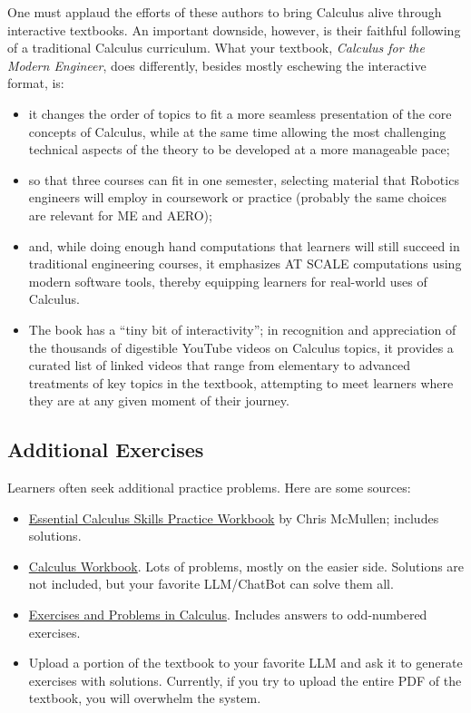 One must applaud the efforts of these authors to bring Calculus alive through interactive textbooks. An important downside, however, is their faithful following of a traditional Calculus curriculum. What your textbook, \textit{Calculus for the Modern Engineer}, does differently, besides mostly eschewing the interactive format, is:
\begin{itemize}
    \item it changes the order of topics to fit a more seamless presentation of the core concepts of Calculus, while at the same time allowing the most challenging technical aspects of the theory to be developed at a more manageable pace;
\item so that three courses can fit in one semester, selecting material that Robotics engineers will employ in coursework or practice (probably the same choices are relevant for ME and AERO);
\item and, while doing enough hand computations that learners will still succeed in traditional engineering courses, it emphasizes AT SCALE computations using modern software tools, thereby equipping learners for real-world uses of Calculus.
\item The book has a ``tiny bit of interactivity''; in recognition and appreciation of the thousands of digestible YouTube videos on Calculus topics, it provides a curated list of linked videos that range from elementary to advanced treatments of key topics in the textbook, attempting to meet learners where they are at any given moment of their journey. 
\end{itemize}

\subsection{Additional Exercises}

Learners often seek additional practice problems. Here are some sources:

\begin{itemize}

\item \href{https://www.youtube.com/shorts/TfhrNKDw4MY?feature=share}{Essential Calculus Skills Practice Workbook} by Chris McMullen; includes solutions. 

\item \href{https://www.rrcs.org/Downloads/Calc%20Workbook.pdf}{Calculus Workbook}. Lots of problems, mostly on the easier side. Solutions are not included, but your favorite LLM/ChatBot can solve them all. 

\item \href{https://web.pdx.edu/~erdman/CALCULUS/CALCULUS_pdf.pdf}{Exercises and Problems in Calculus}. Includes answers to odd-numbered exercises.

 \item Upload a portion of the textbook to your favorite LLM and ask it to generate exercises with solutions. Currently, if you try to upload the entire PDF of the textbook, you will overwhelm the system. 
\end{itemize}

